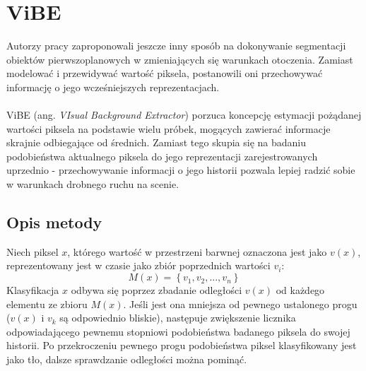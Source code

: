 \section{ViBE}
Autorzy pracy \cite{barnich2011vibe} zaproponowali jeszcze inny sposób na dokonywanie segmentacji obiektów pierwszoplanowych w zmieniających się warunkach otoczenia. Zamiast modelować i przewidywać wartość piksela, postanowili oni przechowywać informację o jego wcześniejszych reprezentacjach.
\paragraph{}
ViBE (ang. \textit{VIsual Background Extractor}) porzuca koncepcję estymacji pożądanej wartości piksela na podstawie wielu próbek, mogących zawierać informacje skrajnie odbiegające od średnich. Zamiast tego skupia się na badaniu podobieństwa aktualnego piksela do jego reprezentacji zarejestrowanych uprzednio - przechowywanie informacji o jego historii pozwala lepiej radzić sobie w warunkach drobnego ruchu na scenie.
\subsection{Opis metody}
Niech piksel $x$, którego wartość w przestrzeni barwnej oznaczona jest jako $v(x)$, reprezentowany jest w czasie jako zbiór poprzednich wartości $v_{i}$:
\begin{equation}
\label{eq:prevValVibe}
M(x) = \left\{v_{1}, v_{2}, ..., v_{n}\right\}
\end{equation}
Klasyfikacja $x$ odbywa się poprzez zbadanie odległości $v(x)$ od każdego elementu ze zbioru $M(x)$. Jeśli jest ona mniejsza od pewnego ustalonego progu ($v(x)$ i $v_{k}$ są odpowiednio bliskie), następuje zwiększenie licznika odpowiadającego pewnemu stopniowi podobieństwa badanego piksela do swojej historii. Po przekroczeniu pewnego progu podobieństwa piksel klasyfikowany jest jako tło, dalsze sprawdzanie odległości można pominąć.
